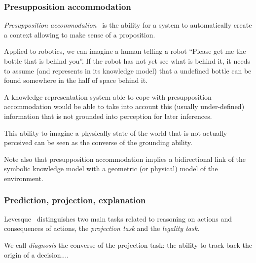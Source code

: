 \subsubsection{Presupposition accommodation}
\label{sect|presupposition-accommodation}

\emph{Presupposition accommodation}~\cite{VonFintel2008} is the ability for a
system to automatically create a context allowing to make sense of a
proposition.

Applied to robotics, we can imagine a human telling a robot ``Please get me the
bottle that is behind you''. If the robot has not yet see what is behind it, it
needs to assume (and represents in its knowledge model) that a undefined bottle
can be found somewhere in the half of space behind it.

A knowledge representation system able to cope with presupposition
accommodation would be able to take into account this (usually under-defined)
information that is not grounded into perception for later inferences.

This ability to imagine a physically state of the world that is not actually
perceived can be seen as the converse of the grounding ability.

Note also that presupposition accommodation implies a bidirectional link of the
symbolic knowledge model with a geometric (or physical) model of the
environment.

\subsubsection{Prediction, projection, explanation}
\label{sect|prediction-projection}

Levesque~\cite{Levesque2008} distinguishes two main tasks related to reasoning
on actions and consequences of actions, the \emph{projection task} and the
\emph{legality task}.

We call \emph{diagnosis} the converse of the projection task: the ability to
track back the origin of a decision....

\begin{scriptsize}
\begin{center}
\end{center}
\end{scriptsize}


